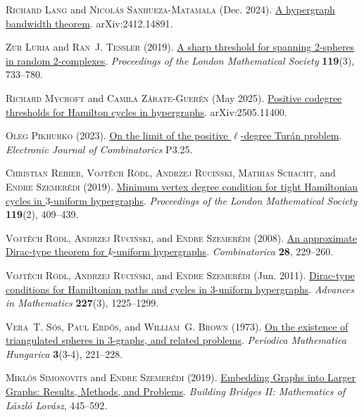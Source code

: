\documentclass[12pt,reqno]{amsart}
\theoremstyle{plain}
\theoremstyle{definition}
\numberwithin{equation}{section}
\begin{document}
{\begin{thebibliography}{GHMN22}
			\textsc{Richard Lang} and \textsc{Nicol\'{a}s Sanhueza-Matamala} (Dec. 2024).
			\newblock \href{http://arxiv.org/abs/2412.14891}{A hypergraph bandwidth theorem}.
			\newblock arXiv:2412.14891.
			
			\textsc{Zur Luria} and \textsc{Ran~J. Tessler} (2019).
			\newblock \href{https://doi.org/10.1112/plms.12247}{A sharp threshold for spanning 2-spheres in random 2-complexes}.
			\newblock \emph{Proceedings of the London Mathematical Society} \textbf{119}(3), 733--780.
			
			\textsc{Richard Mycroft} and \textsc{Camila Z{\'a}rate-Guer{\'e}n} (May 2025).
			\newblock \href{http://arxiv.org/abs/2505.11400}{Positive codegree thresholds for {H}amilton cycles in hypergraphs}.
			\newblock arXiv:2505.11400.
			
			\textsc{Oleg Pikhurko} (2023).
			\newblock \href{https://doi.org/10.37236/11912}{On the limit of the positive $\ell$-degree {T}ur{\'a}n problem}.
			\newblock \emph{Electronic Journal of Combinatorics} P3.25.
			
			\textsc{Christian Reiher}, \textsc{Vojt{\v{e}}ch R{\"o}dl}, \textsc{Andrzej Ruci{\'n}ski}, \textsc{Mathias Schacht}, and \textsc{Endre Szemer{\'e}di} (2019).
			\newblock \href{https://doi.org/10.1112/plms.12235}{Minimum vertex degree condition for tight {H}amiltonian cycles in $3$-uniform hypergraphs}.
			\newblock \emph{Proceedings of the London Mathematical Society} \textbf{119}(2), 409--439.
			
			\textsc{Vojt{\v{e}}ch R{\"o}dl}, \textsc{Andrzej Ruci{\'n}ski}, and \textsc{Endre Szemer{\'e}di} (2008).
			\newblock \href{https://doi.org/10.1007/s00493-008-2295-z}{An approximate {D}irac-type theorem for $k$-uniform hypergraphs}.
			\newblock \emph{Combinatorica} \textbf{28}, 229--260.
			
			\textsc{Vojt{\v{e}}ch R{\"o}dl}, \textsc{Andrzej Ruci{\'n}ski}, and \textsc{Endre Szemer{\'e}di} (Jun. 2011).
			\newblock \href{https://doi.org/10.1016/j.aim.2011.03.007}{Dirac-type conditions for {H}amiltonian paths and cycles in 3-uniform hypergraphs}.
			\newblock \emph{Advances in Mathematics} \textbf{227}(3), 1225--1299.
			
			\textsc{Vera~T. S{\'o}s}, \textsc{Paul Erd{\H{o}}s}, and \textsc{William~G. Brown} (1973).
			\newblock \href{https://doi.org/10.1007/BF02018585}{On the existence of triangulated spheres in 3-graphs, and related problems}.
			\newblock \emph{Periodica Mathematica Hungarica} \textbf{3}(3-4), 221--228.
			
			\textsc{Mikl\'os Simonovits} and \textsc{Endre Szemer{\'e}di} (2019).
			\newblock \href{https://doi.org/10.1007/978-3-662-59204-5_14}{Embedding {G}raphs into {L}arger {G}raphs: {R}esults, {M}ethods, and {P}roblems}.
			\newblock \emph{Building Bridges II: Mathematics of L\'aszl\'o Lov\'asz}, 445--592.
			
		\end{thebibliography}
	}
	
\end{document}
